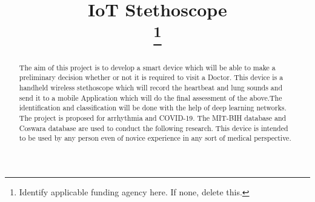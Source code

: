 \documentclass[conference]{IEEEtran}
\begin{document}
\title{IoT Stethoscope\\
\thanks{Identify applicable funding agency here. If none, delete this.}
}

\author{
\and
{}
\and
{}
\and
{}
\and
{}
\and
{}
}

\maketitle

\begin{abstract}
The aim of this project is to develop a smart device which will be able to make a preliminary decision whether or not it is required to visit a Doctor. This device is a handheld wireless stethoscope which will record the heartbeat and lung sounds and send it to a mobile Application which will do the final assessment of the above.The identification and classification will be done with the help of deep learning networks. The project is proposed for arrhythmia and COVID-19. The MIT-BIH database and Coswara database are used to conduct the following research. This device is intended to be used by any person even of novice experience in any sort of medical perspective. 
\end{abstract}
\end{document}

